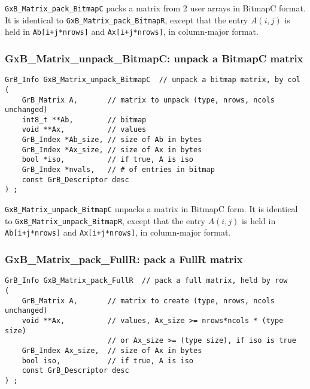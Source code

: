 \documentclass[12pt]{article}
\begin{document}
\verb'GxB_Matrix_pack_BitmapC' packs a matrix from 2 user arrays in BitmapC
format.  It is identical to \verb'GxB_Matrix_pack_BitmapR', except that the
entry $A(i,j)$ is held in \verb'Ab[i+j*nrows]' and \verb'Ax[i+j*nrows]',
in column-major format.

\subsubsection{{\sf GxB\_Matrix\_unpack\_BitmapC:} unpack a BitmapC matrix}
\label{matrix_unpack_bitmapc}

\begin{mdframed}[userdefinedwidth=6in]
{\footnotesize
\begin{verbatim}
GrB_Info GxB_Matrix_unpack_BitmapC  // unpack a bitmap matrix, by col
(
    GrB_Matrix A,       // matrix to unpack (type, nrows, ncols unchanged)
    int8_t **Ab,        // bitmap
    void **Ax,          // values
    GrB_Index *Ab_size, // size of Ab in bytes
    GrB_Index *Ax_size, // size of Ax in bytes
    bool *iso,          // if true, A is iso
    GrB_Index *nvals,   // # of entries in bitmap
    const GrB_Descriptor desc
) ;
\end{verbatim}
} \end{mdframed}

\verb'GxB_Matrix_unpack_BitmapC' unpacks a matrix in BitmapC form.
It is identical to \verb'GxB_Matrix_unpack_BitmapR', except that the
entry $A(i,j)$ is held in \verb'Ab[i+j*nrows]' and \verb'Ax[i+j*nrows]',
in column-major format.

\newpage
\subsubsection{{\sf GxB\_Matrix\_pack\_FullR:} pack a FullR matrix}
\label{matrix_pack_fullr}

\begin{mdframed}[userdefinedwidth=6in]
{\footnotesize
\begin{verbatim}
GrB_Info GxB_Matrix_pack_FullR  // pack a full matrix, held by row
(
    GrB_Matrix A,       // matrix to create (type, nrows, ncols unchanged)
    void **Ax,          // values, Ax_size >= nrows*ncols * (type size)
                        // or Ax_size >= (type size), if iso is true
    GrB_Index Ax_size,  // size of Ax in bytes
    bool iso,           // if true, A is iso
    const GrB_Descriptor desc
) ;
\end{verbatim}
} \end{mdframed}
\end{document}

